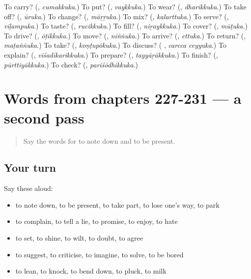 \begin{tcolorbox}[breakable,colback=teal!4,colframe=teal!35!black,title={Before you move on}]
To carry? (\textbf{}, \emph{cumakkuka}.) To put? (\textbf{}, \emph{vaykkuka}.) To wear? (\textbf{}, \emph{dharikkuka}.) To take off? (\textbf{}, \emph{ūruka}.) To change? (\textbf{}, \emph{māṟṟuka}.) To mix? (\textbf{}, \emph{kalarttuka}.) To serve? (\textbf{}, \emph{viḷampuka}.) To taste? (\textbf{}, \emph{rucikkuka}.) To fill? (\textbf{}, \emph{niṟaykkuka}.) To cover? (\textbf{}, \emph{mūṭuka}.) To drive? (\textbf{}, \emph{ōṭikkuka}.) To move? (\textbf{}, \emph{nīṅṅuka}.) To arrive? (\textbf{}, \emph{ettuka}.) To return? (\textbf{}, \emph{maṭaṅṅuka}.) To take? (\textbf{}, \emph{koṇṭupōkuka}.) To discuss? (\textbf{ }, \emph{carcca ceyyuka}.) To explain? (\textbf{}, \emph{viśadīkarikkuka}.) To prepare? (\textbf{}, \emph{tayyāṟākkuka}.) To finish? (\textbf{}, \emph{pūrttiyākkuka}.) To check? (\textbf{}, \emph{pariśōdhikkuka}.)
\end{tcolorbox}
\section[(dialogue)]{Words from chapters 227-231 — a second pass}

\label{lesson:ML-R231-second-pass-words-from-chapters-227-231}



\begin{quote}
Say the words for to note down and to be present.
\end{quote}

\subsection*{Your turn}
Say these aloud:

\begin{itemize}
\raggedright
  \item to note down, to be present, to take part, to lose one's way, to park
  \item to complain, to tell a lie, to promise, to enjoy, to hate
  \item to set, to shine, to wilt, to doubt, to agree
  \item to suggest, to criticise, to imagine, to solve, to be bored
  \item to lean, to knock, to bend down, to pluck, to milk
\end{itemize}

